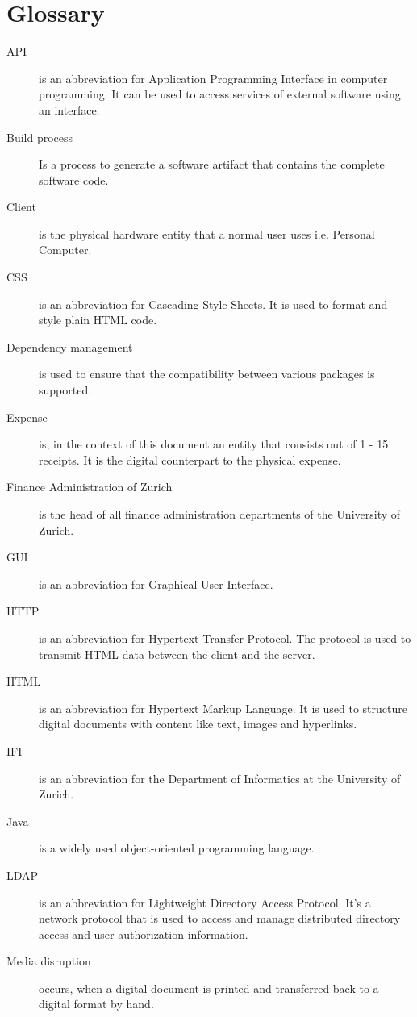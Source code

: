 \chapter*{Glossary}


\begin{description}
    \item[API] is an abbreviation for Application Programming Interface in computer programming. It can be used to access services of external software using an interface.
    \item[Build process] Is a process to generate a software artifact that contains the complete software code.  
    \item[Client] is the physical hardware entity that a normal user uses i.e. Personal Computer.
    \item[CSS] is an abbreviation for Cascading Style Sheets. It is used to format and style plain HTML code. 
    \item[Dependency management] is used to ensure that the compatibility between various packages is supported.
    \item[Expense] is, in the context of this document an entity that consists out of 1 - 15 receipts. It is the digital counterpart to the physical expense.
    \item[Finance Administration of Zurich] is the head of all finance administration departments of the University of Zurich.
    \item[GUI] is an abbreviation for Graphical User Interface. 
    \item[HTTP] is an abbreviation for Hypertext Transfer Protocol. The protocol is used to transmit HTML data between the client and the server.
    \item[HTML] is an abbreviation for Hypertext Markup Language. It is used to structure digital documents with content like text, images and hyperlinks. 
    \item[IFI] is an abbreviation for the Department of Informatics at the University of Zurich.
    \item[Java] is a widely used object-oriented programming language.
    \item[LDAP] is an abbreviation for Lightweight Directory Access Protocol. It's a network protocol that is used to access and manage distributed directory access and user authorization information. 
    \item[Media disruption] occurs, when a digital document is printed and transferred back to a digital format by hand.

\end{description}
